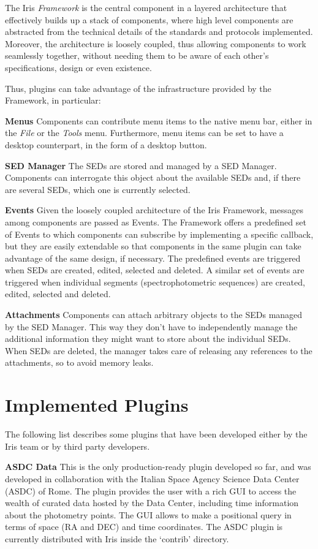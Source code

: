 \documentclass[11pt,twoside]{article}
\begin{document}
The Iris \emph{Framework} is the central component in a layered architecture that effectively builds up a stack of components, where high level components are abstracted from the technical details of the standards and protocols implemented. Moreover, the architecture is loosely coupled, thus allowing components to work seamlessly together, without needing them to be aware of each other's specifications, design or even existence.

Thus, plugins can take advantage of the infrastructure provided by the Framework, in particular:

\textbf{Menus}
Components can contribute menu items to the native menu bar, either in the \emph{File} or the \emph{Tools} menu. Furthermore, menu items can be set to have a desktop counterpart, in the form of a desktop button.

\textbf{SED Manager}
The SEDs are stored and managed by a SED Manager. Components can interrogate this object about the available SEDs and, if there are several SEDs, which one is currently selected.

\textbf{Events}
Given the loosely coupled architecture of the Iris Framework, messages among components are passed as Events. The Framework offers a predefined set of Events to which components can subscribe by implementing a specific callback, but they are easily extendable so that components in the same plugin can take advantage of the same design, if necessary. The predefined events are triggered when SEDs are created, edited, selected and deleted. A similar set of events are triggered when individual segments (spectrophotometric sequences) are created, edited, selected and deleted.

\textbf{Attachments}
Components can attach arbitrary objects to the SEDs managed by the SED Manager. This way they don't have to independently manage the additional information they might want to store about the individual SEDs. When SEDs are deleted, the manager takes care of releasing any references to the attachments, so to avoid memory leaks.

\section{Implemented Plugins}
The following list describes some plugins that have been developed either by the Iris team or by third party developers.

\textbf{ASDC Data}
This is the only production-ready plugin developed so far, and was developed in collaboration with the Italian Space Agency Science Data Center (ASDC) of Rome. The plugin provides the user with a rich GUI to access the wealth of curated data hosted by the Data Center, including time information about the photometry points. The GUI allows to make a positional query in terms of space (RA and DEC) and time coordinates.
The ASDC plugin is currently distributed with Iris inside the `contrib' directory.
\end{document}
